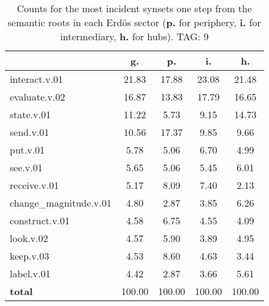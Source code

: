 \begin{table}[h!]
\begin{center}
\begin{tabular}{| l || c | c | c | c |}\hline
 & {\bf g.} & {\bf p.} & {\bf i.} & {\bf h.} \\\hline\hline
interact.v.01 & 21.83  & 17.88  & 23.08  & 21.48 \\\hline
evaluate.v.02 & 16.87  & 13.83  & 17.79  & 16.65 \\\hline
state.v.01 & 11.22  & 5.73  & 9.15  & 14.73 \\\hline
send.v.01 & 10.56  & 17.37  & 9.85  & 9.66 \\\hline
put.v.01 & 5.78  & 5.06  & 6.70  & 4.99 \\\hline
see.v.01 & 5.65  & 5.06  & 5.45  & 6.01 \\\hline
receive.v.01 & 5.17  & 8.09  & 7.40  & 2.13 \\\hline
change\_magnitude.v.01 & 4.80  & 2.87  & 3.85  & 6.26 \\\hline
construct.v.01 & 4.58  & 6.75  & 4.55  & 4.09 \\\hline
look.v.02 & 4.57  & 5.90  & 3.89  & 4.95 \\\hline
keep.v.03 & 4.53  & 8.60  & 4.63  & 3.44 \\\hline
label.v.01 & 4.42  & 2.87  & 3.66  & 5.61 \\\hline\hline
{{\bf total}} & 100.00  & 100.00  & 100.00  & 100.00 \\\hline
\end{tabular}
\caption{Counts for the most incident synsets one step from the semantic roots in each Erd\"os sector ({\bf p.} for periphery, {\bf i.} for intermediary, {\bf h.} for hubs). TAG: 9}
\end{center}
\end{table}
